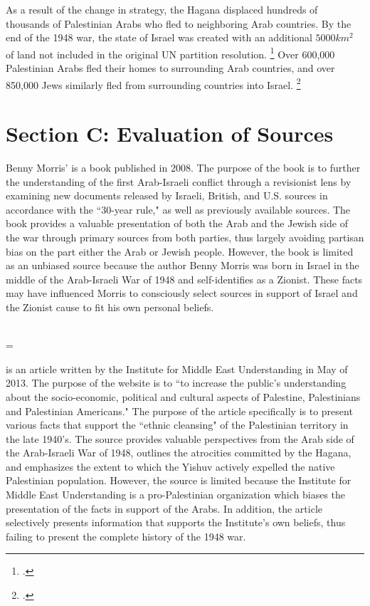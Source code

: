 \documentclass[11pt]{turabian-researchpaper}
\begin{document}
As a result of the change in strategy, the Hagana displaced hundreds of thousands of Palestinian Arabs who fled to neighboring Arab countries.  By the end of the 1948 war, the state of Israel was created with an additional $5000km^2$ of land not included in the original UN partition resolution.
\footcite{lorch}
Over 600,000 Palestinian Arabs fled their homes to surrounding Arab countries, and over 850,000 Jews similarly fled from surrounding countries into Israel.
\footcite{bartal}

\section{Section C: Evaluation of Sources}
\noindent {}



Benny Morris'  is a book published in 2008.  The purpose of the book is to further the understanding of the first Arab-Israeli conflict through a revisionist lens by examining new documents released by Israeli, British, and U.S. sources in accordance with the ``30-year rule," as well as previously available sources.  The book provides a valuable presentation of both the Arab and the Jewish side of the war through primary sources from both parties, thus largely avoiding partisan bias on the part either the Arab or Jewish people.  However, the book is limited as an unbiased source because the author Benny Morris was born in Israel in the middle of the Arab-Israeli War of 1948 and self-identifies as a Zionist.  These facts may have influenced Morris to consciously select sources in support of Israel and the Zionist cause to fit his own personal beliefs.



~\\



\hangindent=\parindent \noindent {}



 is an article written by the Institute for Middle East Understanding in May of 2013.  The purpose of the website is to ``to increase the public's understanding about the socio-economic, political and cultural aspects of Palestine, Palestinians and Palestinian Americans."  The purpose of the article specifically is to present various facts that support the ``ethnic cleansing" of the Palestinian territory in the late 1940's.  The source provides valuable perspectives from the Arab side of the Arab-Israeli War of 1948, outlines the atrocities committed by the Hagana, and emphasizes the extent to which the Yishuv actively expelled the native Palestinian population.  However, the source is limited because the Institute for Middle East Understanding is a pro-Palestinian organization which biases the presentation of the facts in support of the Arabs.  In addition, the article selectively presents information that supports the Institute's own beliefs, thus failing to present the complete history of the 1948 war.
\end{document}
